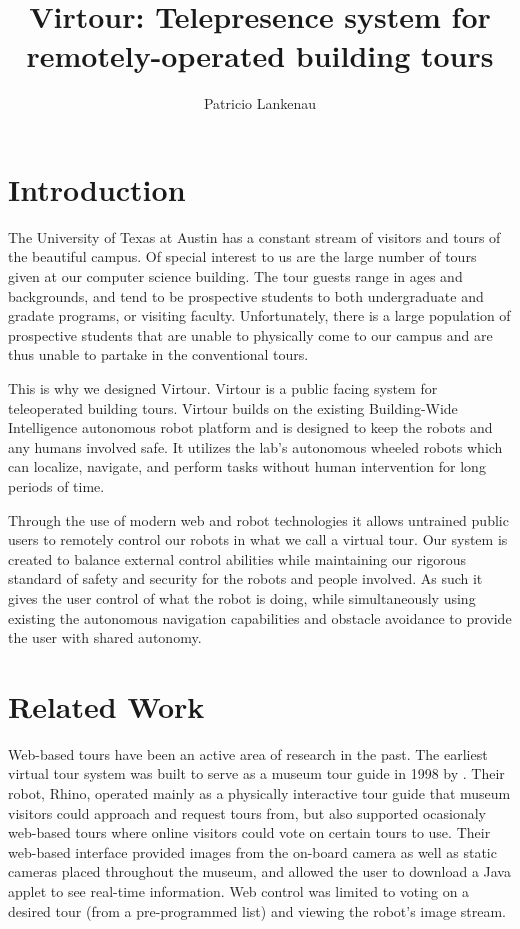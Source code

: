 \documentclass[
  oneside,
  11pt, a4paper,
  footinclude=true,
  headinclude=true,
  cleardoublepage=empty
]{article}
\title{Virtour: Telepresence system for remotely-operated building tours}
\author{Patricio Lankenau}
\begin{document}
\maketitle

\section{Introduction}

The University of Texas at Austin has a constant stream of visitors and tours
of the beautiful campus. Of special interest to us are the large number of
tours given at our computer science building. The tour guests range in ages and
backgrounds, and tend to be prospective students to both undergraduate and
gradate programs, or visiting faculty. Unfortunately, there is a large
population of prospective students that are unable to physically come to our
campus and are thus unable to partake in the conventional tours.

This is why we designed Virtour. Virtour is a public facing system for
teleoperated building tours. Virtour builds on the existing Building-Wide
Intelligence autonomous robot platform and is designed to keep the robots and
any humans involved safe.  It utilizes the lab's autonomous wheeled robots
which can localize, navigate, and perform tasks without human intervention for
long periods of time.

Through the use of modern web and robot technologies it allows untrained public
users to remotely control our robots in what we call a virtual tour. Our system
is created to balance external control abilities while maintaining our rigorous
standard of safety and security for the robots and people involved. As such it
gives the user control of what the robot is doing, while simultaneously using
existing the autonomous navigation capabilities and obstacle avoidance to
provide the user with shared autonomy.

\section{Related Work}

Web-based tours have been an active area of research in the past. The earliest
virtual tour system was built to serve as a museum tour guide in 1998 by
\cite{burgard1998}. Their robot, Rhino, operated mainly as a physically
interactive tour guide that museum visitors could approach and request tours
from, but also supported ocasionaly web-based tours where online visitors could
vote on certain tours to use. Their web-based interface provided images from
the on-board camera as well as static cameras placed throughout the museum, and
allowed the user to download a Java applet to see real-time information. Web
control was limited to voting on a desired tour (from a pre-programmed list)
and viewing the robot's image stream.
\end{document}
